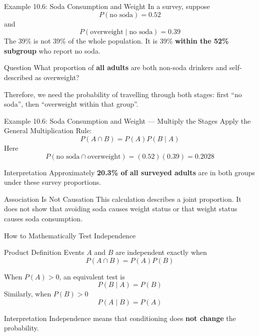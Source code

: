 \documentclass[aspectratio=169]{beamer}
\begin{document}
\begin{frame}{Example 10.6: Soda Consumption and Weight}
In a survey, suppose
$$P(\text{no soda})=0.52$$
and
$$P(\text{overweight}\mid\text{no soda})=0.39$$
The 39\% is not 39\% of the whole population. It is 39\% \textbf{within the 52\% subgroup} who report no soda.

\begin{block}{Question}
What proportion of \textbf{all adults} are both non-soda drinkers and self-described as overweight?
\end{block}

Therefore, we need the probability of travelling through both stages: first ``no soda'', then ``overweight within that group''.
\end{frame}

\begin{frame}{Example 10.6: Soda Consumption and Weight --- Multiply the Stages}
Apply the General Multiplication Rule:
$$P(A\cap B)=P(A)P(B\mid A)$$
Here
\[
    P(\text{no soda}\cap\text{overweight}) =(0.52)(0.39) =\mathbf{0.2028}
\]
\begin{block}{Interpretation}
    Approximately \textbf{20.3\% of all surveyed adults} are in both groups under these survey proportions.
\end{block}
\begin{alertblock}{Association Is Not Causation}
This calculation describes a joint proportion. It does not show that avoiding soda causes weight status or that weight status causes soda consumption.
\end{alertblock}
\end{frame}

\begin{frame}{How to Mathematically Test Independence}
\begin{block}{Product Definition}
Events $A$ and $B$ are independent exactly when
$$P(A\cap B)=P(A)P(B)$$
\end{block}
  
When $P(A)>0$, an equivalent test is
$$P(B\mid A)=P(B)$$
  Similarly, when $P(B)>0$
$$P(A\mid B)=P(A)$$
\begin{block}{Interpretation}
Independence means that conditioning does \textbf{not change} the probability.
  \end{block}
\end{frame}
\end{document}
